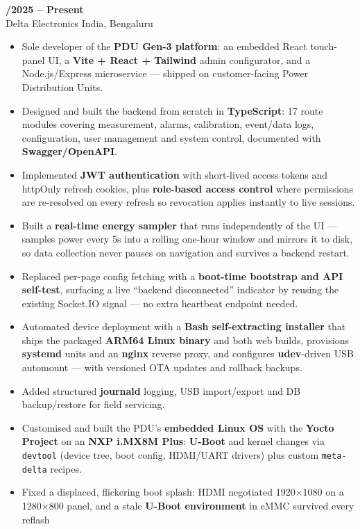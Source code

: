 \documentclass[a4paper,10pt]{article}
\newcommand{\role}[3]{%
  \vspace{5pt}%
  \noindent{\color{primary}\bfseries\fontsize{10.6}{12}\selectfont #1}%
  \hfill{\bfseries\fontsize{9.6}{11}\selectfont #2}\\[1pt]
  {\color{muted}\fontsize{9.6}{11}\selectfont #3}%
  \vspace{-3pt}%
}
\begin{document}
\role{Senior Software Engineer --- Full Stack}{06/2025 -- Present}{Delta Electronics India, Bengaluru}
\begin{itemize}
  \item Sole developer of the \textbf{PDU Gen-3 platform}: an embedded React touch-panel UI, a
    \textbf{Vite + React + Tailwind} admin configurator, and a Node.js/Express microservice ---
    shipped on customer-facing Power Distribution Units.
  \item Designed and built the backend from scratch in \textbf{TypeScript}: 17 route modules
    covering measurement, alarms, calibration, event/data logs, configuration, user management
    and system control, documented with \textbf{Swagger/OpenAPI}.
  \item Implemented \textbf{JWT authentication} with short-lived access tokens and httpOnly
    refresh cookies, plus \textbf{role-based access control} where permissions are re-resolved on
    every refresh so revocation applies instantly to live sessions.
  \item Built a \textbf{real-time energy sampler} that runs independently of the UI --- samples
    power every 5s into a rolling one-hour window and mirrors it to disk, so data collection
    never pauses on navigation and survives a backend restart.
  \item Replaced per-page config fetching with a \textbf{boot-time bootstrap and API self-test},
    surfacing a live ``backend disconnected'' indicator by reusing the existing Socket.IO
    signal --- no extra heartbeat endpoint needed.
  \item Automated device deployment with a \textbf{Bash self-extracting installer} that ships the
    packaged \textbf{ARM64 Linux binary} and both web builds, provisions \textbf{systemd} units
    and an \textbf{nginx} reverse proxy, and configures \textbf{udev}-driven USB automount ---
    with versioned OTA updates and rollback backups.
  \item Added structured \textbf{journald} logging, USB import/export and DB backup/restore for
    field servicing.
  \item Customised and built the PDU's \textbf{embedded Linux OS} with the \textbf{Yocto Project}
    on an \textbf{NXP i.MX8M Plus}: \textbf{U-Boot} and kernel changes via \texttt{devtool}
    (device tree, boot config, HDMI/UART drivers) plus custom \texttt{meta-delta} recipes.
  \item Fixed a displaced, flickering boot splash: HDMI negotiated 1920$\times$1080 on a
    1280$\times$800 panel, and a stale \textbf{U-Boot environment} in eMMC survived every reflash

\end{itemize}
\end{document}
